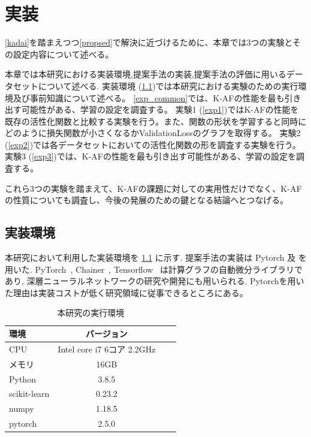 \chapter{実装}
\label{implementation}

\ref{kadai}を踏まえつつ\ref{propsed}で解決に近づけるために、本章では3つの実験とその設定内容について述べる。

本章では本研究における実装環境,提案手法の実装,提案手法の評価に用いるデータセットについて述べる.
実装環境 (\ref{impl_env})では本研究における実験のための実行環境及び事前知識について述べる。
\ref{exp_common}では、K-AFの性能を最も引き出す可能性がある、学習の設定を調査する。
実験1 (\ref{exp1})ではK-AFの性能を既存の活性化関数と比較する実験を行う。また、関数の形状を学習すると同時にどのように損失関数が小さくなるかValidationLossのグラフを取得する。
実験2 (\ref{exp2})では各データセットにおいての活性化関数の形を調査する実験を行う。
実験3 (\ref{exp3})では、K-AFの性能を最も引き出す可能性がある、学習の設定を調査する。

これら3つの実験を踏まえて、K-AFの課題に対しての実用性だけでなく、K-AFの性質についても調査し、今後の発展のための鍵となる結論へとつなげる。



\section{実装環境}
\label{impl_env}



本研究において利用した実装環境を \ref{impl_table} に示す. 提案手法の実装は Pytorch 及
を用いた.  PyTorch~\cite{pytorch}, Chainer~\cite{chainer},  Tensorflow~\cite{tensorflow} は計算グラフの自動微分ライブラリであり, 深層ニューラルネットワークの研究や開発にも用いられる.
Pytorchを用いた理由は実装コストが低く研究領域に従事できるところにある。


\begin{table}[htbp]
\label{impl_table}
    \begin{center}
        \caption{本研究の実行環境}
        \vspace{2mm} 
        \begin{tabular}{l*{2}{c}r}
        環境              & バージョン \\
        \hline
        CPU               & Intel core i7 6コア 2.2GHz \\
        メモリ             & 16GB \\
        Python            & 3.8.5  \\
        scikit-learn      & 0.23.2\\
        numpy             & 1.18.5 \\
        pytorch           & 2.5.0 \\
        \end{tabular}
    \end{center}
\end{table}



